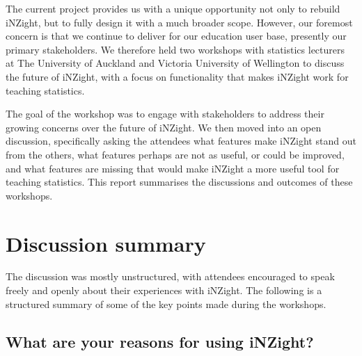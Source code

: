 \documentclass{article}
\begin{document}
The current project provides us with a unique opportunity not only to rebuild iNZight, but to fully design it with a much broader scope.
However, our foremost concern is that we continue to deliver for our education user base, presently our primary stakeholders.
We therefore held two workshops with statistics lecturers at The University of Auckland and Victoria University of Wellington to discuss the future of iNZight, with a focus on functionality that makes iNZight work for teaching statistics.

The goal of the workshop was to engage with stakeholders to address their growing concerns over the future of iNZight.
We then moved into an open discussion, specifically asking the attendees what features make iNZight stand out from the others, what features perhaps are not as useful, or could be improved, and what features are missing that would make iNZight a more useful tool for teaching statistics.
This report summarises the discussions and outcomes of these workshops.


\section{Discussion summary}

The discussion was mostly unstructured, with attendees encouraged to speak freely and openly about their experiences with iNZight.
The following is a structured summary of some of the key points made during the workshops.

\subsection{What are your reasons for using iNZight?}
\end{document}
